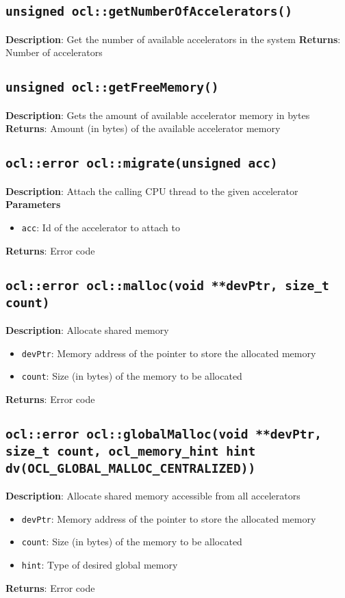 \subsection{\texttt{unsigned ocl::getNumberOfAccelerators()}}

\textbf{Description}: Get the number of available accelerators in the system
\textbf{Returns}: Number of accelerators

\subsection{\texttt{unsigned ocl::getFreeMemory()}}

\textbf{Description}: Gets the amount of available accelerator memory in bytes
\textbf{Returns}: Amount (in bytes) of the available accelerator memory

\subsection{\texttt{ocl::error ocl::migrate(unsigned acc)}}

\textbf{Description}: Attach the calling CPU thread to the given accelerator
\textbf{Parameters}
\begin{itemize}
  \item \texttt{acc}: Id of the accelerator to attach to
\end{itemize}
\textbf{Returns}: Error code

\subsection{\texttt{ocl::error ocl::malloc(void **devPtr, size\_t count)}}

\textbf{Description}: Allocate shared memory
\begin{itemize}
  \item \texttt{devPtr}: Memory address of the pointer to store the allocated memory
  \item \texttt{count}: Size (in bytes) of the memory to be allocated
\end{itemize}
\textbf{Returns}: Error code

\subsection{\texttt{ocl::error ocl::globalMalloc(void **devPtr, size\_t count, ocl\_memory\_hint 
hint dv(OCL\_GLOBAL\_MALLOC\_CENTRALIZED))}}

\textbf{Description}: Allocate shared memory accessible from all accelerators
\begin{itemize}
  \item \texttt{devPtr}: Memory address of the pointer to store the allocated memory
  \item \texttt{count}: Size (in bytes) of the memory to be allocated
  \item \texttt{hint}: Type of desired global memory
\end{itemize}
\textbf{Returns}: Error code


